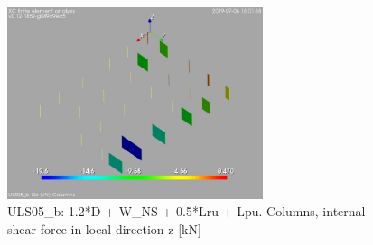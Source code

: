 \begin{figure}
\begin{center}
\includegraphics[width=75mm]{annex_res_columns/graphics/resSimplLC/ULS05_bcolumnsQz}
\caption{ULS05\_b: 1.2*D + W\_NS + 0.5*Lru + Lpu. Columns, internal shear force in local direction z [kN]}
\end{center}
\end{figure}


